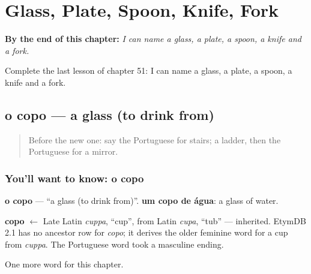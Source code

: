 
\chapter{Glass, Plate, Spoon, Knife, Fork}
\label{ch:pt-glass-plate-spoon-knife-fork}

\begin{chapteropening}
\textbf{By the end of this chapter:} \emph{I can name a glass, a plate, a spoon, a knife and a fork.}

Complete the last lesson of chapter 51: I can name a glass, a plate, a spoon, a knife and a fork.
\end{chapteropening}

\section[o copo]{o copo — a glass (to drink from)}

\label{lesson:PT-C51-copo}



\begin{quote}
Before the new one: say the Portuguese for stairs; a ladder, then the Portuguese for a mirror.
\end{quote}

\subsection*{You'll want to know: o copo}
\textbf{o copo} — \textquotedblleft{}a glass (to drink from)\textquotedblright{}. \textbf{um copo de água}: a glass of water.

\begin{cousinweb}
\textbf{copo} $\leftarrow$ Late Latin \emph{cuppa}, \textquotedblleft{}cup\textquotedblright{}, from Latin \emph{cupa}, \textquotedblleft{}tub\textquotedblright{} — inherited. EtymDB 2.1 has no ancestor row for \emph{copo}; it derives the older feminine word for a cup from \emph{cuppa}. The Portuguese word took a masculine ending.
\end{cousinweb}

\begin{grammarlens}[title={What you've built}]
One more word for this chapter.
\end{grammarlens}

